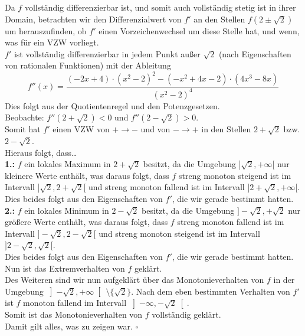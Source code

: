 \documentclass[12pt, a4paper]{article}
\newcommand*{\qed}{\null\nobreak\hfill\ensuremath{\square}}
\begin{document}
Da \(f\) vollständig differenzierbar ist, und somit auch vollständig stetig ist in ihrer Domain, betrachten wir den Differenzialwert von \(f'\) an den Stellen \(f(2 \pm \sqrt{2})\) um herauszufinden, ob \(f'\) einen Vorzeichenwechsel um diese Stelle hat, und wenn, was für ein VZW vorliegt. \\
\(f'\) ist vollständig differenzierbar in jedem Punkt außer \(\sqrt{2}\) (nach Eigenschaften von rationalen Funktionen) mit der Ableitung \[f''(x) = \frac{(-2x+4) \cdot (x^2-2)^2 - (-x^2 + 4x -2) \cdot (4x^3-8x)}{(x^2-2)^4}\]
Dies folgt aus der Quotientenregel und den Potenzgesetzen. \\
Beobachte: \(f''(2 + \sqrt{2}) < 0\) und \(f''(2 - \sqrt{2}) > 0\). \\
Somit hat \(f'\) einen VZW von \(+ \rightarrow -\) und von \(- \rightarrow +\) in den Stellen \(2 + \sqrt{2}\) bzw. \(2 - \sqrt{2}\). \\
Hieraus folgt, dass\dots \pagebreak \\
\textbf{1.:} \(f\) ein lokales Maximum in \(2 + \sqrt{2}\) besitzt, da die Umgebung \(]\sqrt{2}, +\infty[\) nur kleinere Werte enthält, was daraus folgt, dass \(f\) streng monoton steigend ist im Intervall \(]\sqrt{2}, 2+\sqrt{2}[\) und streng monoton fallend ist im Intervall \(]2+\sqrt{2}, +\infty[\). \\
Dies beides folgt aus den Eigenschaften von \(f'\), die wir gerade bestimmt hatten. \\
\textbf{2.:} \(f\) ein lokales Minimum in \(2 - \sqrt{2}\) besitzt, da die Umgebung \(]- \sqrt{2}, + \sqrt{2}\) nur größere Werte enthält, was daraus folgt, dass \(f\) streng monoton fallend ist im Intervall \(] - \sqrt{2}, 2 - \sqrt{2}[\) und streng monoton steigend ist im Intervall \(]2 - \sqrt{2}, \sqrt{2}[\). \\
Dies beides folgt aus den Eigenschaften von \(f'\), die wir gerade bestimmt hatten. \\
Nun ist das Extremverhalten von \(f\) geklärt.\\
Des Weiteren sind wir nun aufgeklärt über das Monotonieverhalten von \(f\) in der Umgebung \(\left]-\sqrt{2}, +\infty\right[\  \setminus \{\sqrt{2}\}\). Nach dem eben bestimmten Verhalten von \(f'\) ist \(f\) monoton fallend im Intervall \(\left]-\infty, -\sqrt{2}\right[\).\\
Somit ist das Monotonieverhalten von \(f\) vollständig geklärt.\\
Damit gilt alles, was zu zeigen war. \qed \pagebreak
\end{document}
